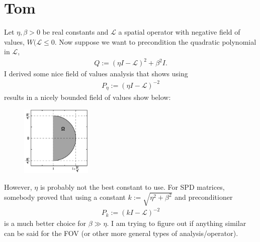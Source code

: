 \documentclass[a4paper,10pt]{article}
\begin{document}
\allowdisplaybreaks

\section{Tom}

Let $\eta,\beta > 0$ be real constants and $\mathcal{L}$ a spatial operator with
negative field of values, $W(\mathcal{L} \leq 0$. Now suppose we want to precondition
the quadratic polynomial in $\mathcal{L}$,
%
\begin{align*}
Q := (\eta I - \mathcal{L})^2 + \beta^2 I.
\end{align*}
%
I derived some nice field of values analysis that shows using
%
\begin{align*}
P_\eta := (\eta I - \mathcal{L})^{-2}
\end{align*}
%
results in a nicely bounded field of values show below:
%
\begin{figure}[h!]
\centering
\includegraphics[width = 0.3\textwidth]{./fov_fig.pdf}
\caption{}
\label{fig:bound}
\end{figure}
%

However, $\eta$ is probably not the best constant to use. For SPD matrices, 
somebody proved that using a constant $k := \sqrt{\eta^2+\beta^2}$ and
preconditioner
%
\begin{align*}
P_k := (k I - \mathcal{L})^{-2}
\end{align*}
%
is a much better choice for $\beta \gg \eta$. I am trying to figure out if
anything similar can be said for the FOV (or other more general types of
analysis/operator).
\end{document}
